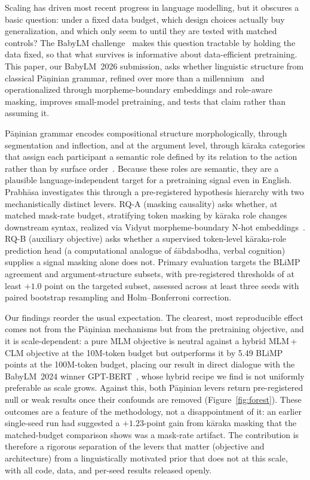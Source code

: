 Scaling has driven most recent progress in language modelling, but it obscures a basic question: under a fixed data budget, which design choices actually buy generalization, and which only seem to until they are tested with matched controls? The BabyLM challenge~\cite{Warstadt2023, Hu2024BabyLM} makes this question tractable by holding the data fixed, so that what survives is informative about data-efficient pretraining. This paper, our BabyLM~2026 submission, asks whether linguistic structure from classical Pāṇinian grammar, refined over more than a millennium~\cite{Matilal1990WordWorld} and operationalized through morpheme-boundary embeddings and role-aware masking, improves small-model pretraining, and tests that claim rather than assuming it.

Pāṇinian grammar encodes compositional structure morphologically, through segmentation and inflection, and at the argument level, through kāraka categories that assign each participant a semantic role defined by its relation to the action rather than by surface order~\cite{KiparskyStaal1969, Cardona1974Karaka}. Because these roles are semantic, they are a plausible language-independent target for a pretraining signal even in English. Prabhāsa investigates this through a pre-registered hypothesis hierarchy with two mechanistically distinct levers. RQ-A (masking causality) asks whether, at matched mask-rate budget, stratifying token masking by kāraka role changes downstream syntax, realized via Vidyut morpheme-boundary N-hot embeddings~\cite{Prasad2024Vidyut}. RQ-B (auxiliary objective) asks whether a supervised token-level kāraka-role prediction head (a computational analogue of śābdabodha, verbal cognition) supplies a signal masking alone does not. Primary evaluation targets the BLiMP agreement and argument-structure subsets, with pre-registered thresholds of at least $+1.0$ point on the targeted subset, assessed across at least three seeds with paired bootstrap resampling and Holm--Bonferroni correction.

Our findings reorder the usual expectation. The clearest, most reproducible effect comes not from the Pāṇinian mechanisms but from the pretraining objective, and it is scale-dependent: a pure MLM objective is neutral against a hybrid MLM\,+\,CLM objective at the 10M-token budget but outperforms it by 5.49 BLiMP points at the 100M-token budget, placing our result in direct dialogue with the BabyLM~2024 winner GPT-BERT~\cite{CharpentierSamuel2024}, whose hybrid recipe we find is not uniformly preferable as scale grows. Against this, both Pāṇinian levers return pre-registered null or weak results once their confounds are removed (Figure~\ref{fig:forest}). These outcomes are a feature of the methodology, not a disappointment of it: an earlier single-seed run had suggested a $+1.23$-point gain from kāraka masking that the matched-budget comparison shows was a mask-rate artifact. The contribution is therefore a rigorous separation of the levers that matter (objective and architecture) from a linguistically motivated prior that does not at this scale, with all code, data, and per-seed results released openly.
